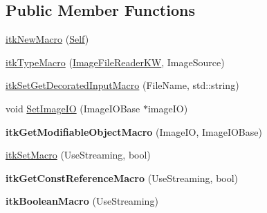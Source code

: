 \subsection*{Public Member Functions}
\begin{DoxyCompactItemize}
\item 
\hyperlink{classitk_1_1_image_file_reader_k_w_a4513482202af52da330f62385fe410d2}{itk\+New\+Macro} (\hyperlink{classitk_1_1_image_file_reader_k_w_a6616e1e0fe9f4aceb7f693250b5f5b5c}{Self})
\item 
\hyperlink{classitk_1_1_image_file_reader_k_w_a47c81c07c8aee4750469f79c97076e87}{itk\+Type\+Macro} (\hyperlink{classitk_1_1_image_file_reader_k_w}{Image\+File\+Reader\+KW}, Image\+Source)
\item 
\hyperlink{classitk_1_1_image_file_reader_k_w_ab33b100a76cddfc01310a5b167994cd7}{itk\+Set\+Get\+Decorated\+Input\+Macro} (File\+Name, std\+::string)
\item 
void \hyperlink{classitk_1_1_image_file_reader_k_w_a5f6df1f414ee32ffc1a7042a2ac7769d}{Set\+Image\+IO} (Image\+I\+O\+Base $\ast$image\+IO)
\item 
{\bfseries itk\+Get\+Modifiable\+Object\+Macro} (Image\+IO, Image\+I\+O\+Base)\hypertarget{classitk_1_1_image_file_reader_k_w_a34921bf522b330b9d2a6904019fea262}{}\label{classitk_1_1_image_file_reader_k_w_a34921bf522b330b9d2a6904019fea262}

\item 
\hyperlink{classitk_1_1_image_file_reader_k_w_adabd23848a1de6aaefe2108eed86de30}{itk\+Set\+Macro} (Use\+Streaming, bool)
\item 
{\bfseries itk\+Get\+Const\+Reference\+Macro} (Use\+Streaming, bool)\hypertarget{classitk_1_1_image_file_reader_k_w_aa762efa75974bceb3af017e411962d01}{}\label{classitk_1_1_image_file_reader_k_w_aa762efa75974bceb3af017e411962d01}

\item 
{\bfseries itk\+Boolean\+Macro} (Use\+Streaming)\hypertarget{classitk_1_1_image_file_reader_k_w_a024a210a9cf0362a910f08efce300ce9}{}\label{classitk_1_1_image_file_reader_k_w_a024a210a9cf0362a910f08efce300ce9}

\end{DoxyCompactItemize}

